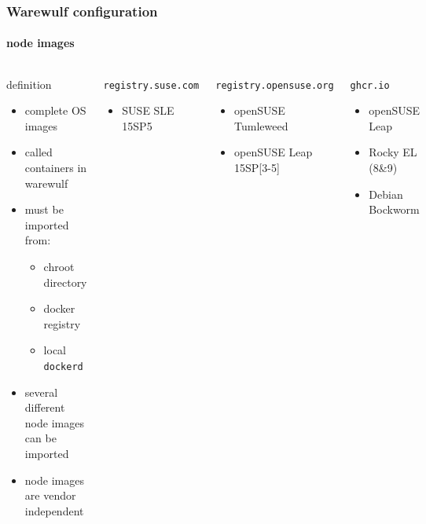 \documentclass[aspectratio=169]{beamer}
\begin{document}
\begin{frame}[fragile]
\frametitle{Warewulf configuration}
\framesubtitle{node images}
\begin{columns}
\begin{block}{definition}
\begin{itemize}
  \item complete OS images
  \item called containers in warewulf
  \item must be imported from:
  \begin{itemize}
    \item chroot directory
    \item docker registry
    \item local \texttt{dockerd}
  \end{itemize}
  \item several different node images can be imported
  \item node images are vendor independent
\end{itemize}
\end{block}
\begin{block}{\texttt{registry.suse.com}}
  \begin{itemize}
    \item SUSE SLE 15SP5
  \end{itemize}
\end{block}
\begin{block}{\texttt{registry.opensuse.org}}
  \begin{itemize}
    \item openSUSE Tumleweed
    \item openSUSE Leap 15SP[3-5]
   \end{itemize}
\end{block}
\begin{block}{\texttt{ghcr.io}}
  \begin{itemize}
    \item openSUSE Leap
    \item Rocky EL (8\&9)
    \item Debian Bockworm
  \end{itemize}
\end{block}
\end{columns}
\end{frame}
%
%
%
%
\end{document}
